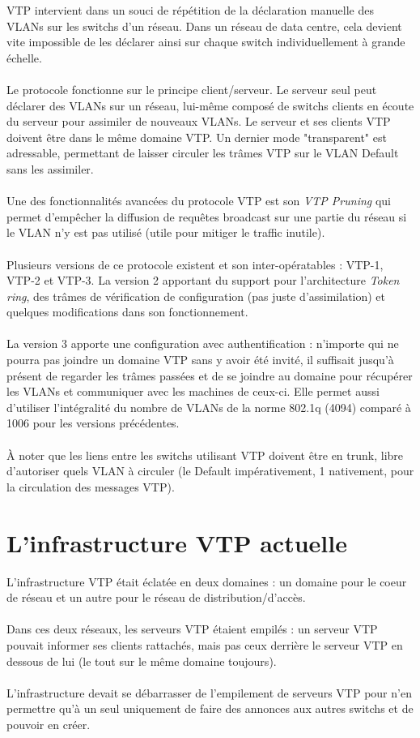 VTP intervient dans un souci de répétition de la déclaration manuelle des VLANs sur les switchs d'un réseau. Dans un réseau de data centre, cela devient vite impossible de les déclarer ainsi sur chaque switch individuellement à grande échelle.
\\ \\
Le protocole fonctionne sur le principe client/serveur. Le serveur seul peut déclarer des VLANs sur un réseau, lui-même composé de switchs clients en écoute du serveur pour assimiler de nouveaux VLANs. Le serveur et ses clients VTP doivent être dans le même domaine VTP. Un dernier mode "transparent" est adressable, permettant de laisser circuler les trâmes VTP sur le VLAN Default sans les assimiler. 
\\ \\
Une des fonctionnalités avancées du protocole VTP est son \textit{VTP Pruning} qui permet d'empêcher la diffusion de requêtes broadcast sur une partie du réseau si le VLAN n'y est pas utilisé (utile pour mitiger le traffic inutile).
\\ \\
Plusieurs versions de ce protocole existent et son inter-opératables : VTP-1, VTP-2 et VTP-3. La version 2 apportant du support pour l'architecture \textit{Token ring}, des trâmes de vérification de configuration (pas juste d'assimilation) et quelques modifications dans son fonctionnement.
\\ \\
La version 3 apporte une configuration avec authentification : n'importe qui ne pourra pas joindre un domaine VTP sans y avoir été invité, il suffisait jusqu'à présent de regarder les trâmes passées et de se joindre au domaine pour récupérer les VLANs et communiquer avec les machines de ceux-ci. Elle permet aussi d'utiliser l'intégralité du nombre de VLANs de la norme 802.1q (4094) comparé à 1006 pour les versions précédentes. 
\\ \\
À noter que les liens entre les switchs utilisant VTP doivent être en trunk, libre d'autoriser quels VLAN à circuler (le Default impérativement, 1 nativement, pour la circulation des messages VTP).

\section{L'infrastructure VTP actuelle}

L'infrastructure VTP était éclatée en deux domaines : un domaine pour le coeur de réseau et un autre pour le réseau de distribution/d'accès.
\\ \\
Dans ces deux réseaux, les serveurs VTP étaient empilés : un serveur VTP pouvait informer ses clients rattachés, mais pas ceux derrière le serveur VTP en dessous de lui (le tout sur le même domaine toujours).
\\ \\
L'infrastructure devait se débarrasser de l'empilement de serveurs VTP pour n'en permettre qu'à un seul uniquement de faire des annonces aux autres switchs et de pouvoir en créer.

